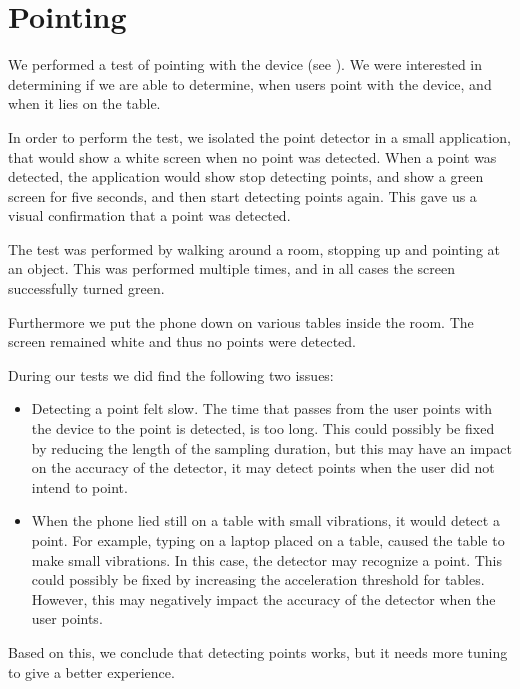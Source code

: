 \section{Pointing}
\label{sec:evaluation:pointing}

We performed a test of pointing with the device (see ).
We were interested in determining if we are able to determine, 
when users point with the device, 
and when it lies on the table.

In order to perform the test, 
we isolated the point detector in a small application, 
that would show a white screen when no point was detected. 
When a point was detected, 
the application would show stop detecting points, 
and show a green screen for five seconds, 
and then start detecting points again.
This gave us a visual confirmation that a point was detected.

The test was performed by walking around a room, 
stopping up and pointing at an object. 
This was performed multiple times, 
and in all cases the screen successfully turned green.

Furthermore we put the phone down on various tables inside the room. 
The screen remained white and thus no points were detected.

During our tests we did find the following two issues:
\begin{itemize}
\item Detecting a point felt slow. The time that passes from the user points with the device to the point is detected, is too long. This could possibly be fixed by reducing the length of the sampling duration, but this may have an impact on the accuracy of the detector, \ie it may detect points when the user did not intend to point.
\item When the phone lied still on a table with small vibrations, it would detect a point. For example, typing on a laptop placed on a table, caused the table to make small vibrations. In this case, the detector may recognize a point. This could possibly be fixed by increasing the acceleration threshold for tables. However, this may negatively impact the accuracy of the detector when the user points.
\end{itemize}

Based on this, we conclude that detecting points works, 
but it needs more tuning to give a better experience. 

